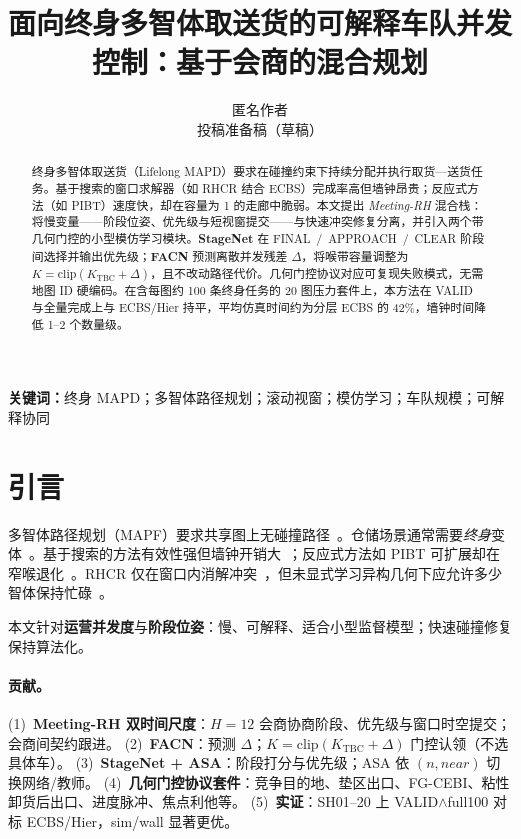 \documentclass[11pt,a4paper]{ctexart}
\title{面向终身多智体取送货的可解释车队并发控制：基于会商的混合规划}
\author{匿名作者\\投稿准备稿（草稿）}
\date{}
\begin{document}
\maketitle

\begin{abstract}
终身多智体取送货（Lifelong MAPD）要求在碰撞约束下持续分配并执行取货—送货任务。基于搜索的窗口求解器（如 RHCR 结合 ECBS）完成率高但墙钟昂贵；反应式方法（如 PIBT）速度快，却在容量为 1 的走廊中脆弱。本文提出 \emph{Meeting-RH} 混合栈：将慢变量——阶段位姿、优先级与短视窗提交——与快速冲突修复分离，并引入两个带几何门控的小型模仿学习模块。\textbf{StageNet} 在 FINAL~/~APPROACH~/~CLEAR 阶段间选择并输出优先级；\textbf{FACN} 预测离散并发残差 $\Delta$，将喉带容量调整为 $K=\mathrm{clip}(K_{\mathrm{TBC}}+\Delta)$，且不改动路径代价。几何门控协议对应可复现失败模式，无需地图 ID 硬编码。在含每图约 100 条终身任务的 20 图压力套件上，本方法在 VALID 与全量完成上与 ECBS/Hier 持平，平均仿真时间约为分层 ECBS 的 42\%，墙钟时间降低 1--2 个数量级。
\end{abstract}

\noindent\textbf{关键词：}终身 MAPD；多智体路径规划；滚动视窗；模仿学习；车队规模；可解释协同

\section{引言}
多智体路径规划（MAPF）要求共享图上无碰撞路径~\citep{sharon2015cbs,stern2019mapf}。仓储场景通常需要\emph{终身}变体~\citep{ma2017mapd2,li2021rhcr}。基于搜索的方法有效性强但墙钟开销大~\citep{barer2014ecbs,li2021rhcr}；反应式方法如 PIBT 可扩展却在窄喉退化~\citep{okumura2022pibt}。RHCR 仅在窗口内消解冲突~\citep{li2021rhcr}，但未显式学习异构几何下应允许多少智体保持忙碌~\citep{chen2024scaling}。

本文针对\textbf{运营并发度}与\textbf{阶段位姿}：慢、可解释、适合小型监督模型；快速碰撞修复保持算法化。

\paragraph{贡献。}
(1)~\textbf{Meeting-RH 双时间尺度}：$H{=}12$ 会商协商阶段、优先级与窗口时空提交；会商间契约跟进。
(2)~\textbf{FACN}：预测 $\Delta$；$K=\mathrm{clip}(K_{\mathrm{TBC}}+\Delta)$ 门控认领（不选具体车）。
(3)~\textbf{StageNet + ASA}：阶段打分与优先级；ASA 依 $(n,\textit{near})$ 切换网络/教师。
(4)~\textbf{几何门控协议套件}：竞争目的地、垫区出口、FG-CEBI、粘性卸货后出口、进度脉冲、焦点利他等。
(5)~\textbf{实证}：SH01--20 上 VALID$\land$full100 对标 ECBS/Hier，sim/wall 显著更优。
\end{document}
